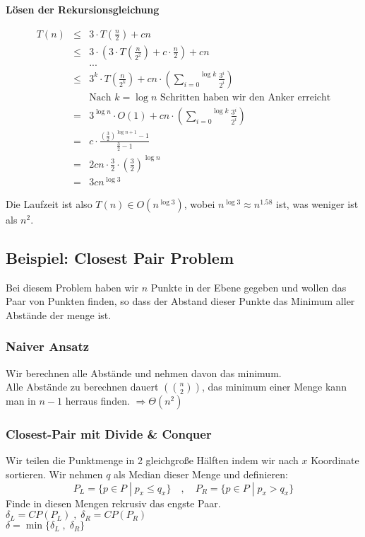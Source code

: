 \textbf{Lösen der Rekursionsgleichung}

$$
\begin{array}{rcl}
T(n) &\leq& 3 \cdot T\left( \frac{n}{2} \right) + cn\\
&\leq& 3 \cdot \left( 3 \cdot T \left( \frac{n}{2^2} \right) + c \cdot \frac{n}{2} \right) + cn\\
&& ... \\
&\leq& 3^k \cdot T\left( \frac{n}{2^k}\right) + cn \cdot \left( \overset{\log k}{\underset{i=0}{\sum}} \frac{3^i}{2^i}\right)\\
&& \text{Nach }k=\log n\text{ Schritten haben wir den Anker erreicht}\\
&=& 3^{\log n} \cdot O(1) + cn \cdot \left( \overset{\log k}{\underset{i=0}{\sum}} \frac{3^i}{2^i}\right)\\
&=& c\cdot \frac{\left( \frac{3}{2}\right)^{\log n + 1} - 1}{\frac{3}{2} - 1}\\
&=& 2cn\cdot \frac{3}{2} \cdot \left( \frac{3}{2} \right)^{\log n}\\
&=&3cn^{\log 3}
\end{array}
$$

Die Laufzeit ist also $T(n) \in O(n^{\log 3})$, wobei $n^{\log 3} \approx n^{1.58}$ ist, was weniger ist als $n^2$.

\subsection{Beispiel: Closest Pair Problem}

Bei diesem Problem haben wir $n$ Punkte in der Ebene gegeben und wollen das Paar von Punkten finden, so dass der Abstand dieser Punkte das Minimum aller Abstände der menge ist.

\subsubsection{Naiver Ansatz}
Wir berechnen alle Abstände und nehmen davon das minimum.\\
Alle Abstände zu berechnen dauert $\left( n \choose 2 \right)$, das minimum einer Menge kann man in $n-1$ herraus finden.
$\Rightarrow \Theta (n^2)$

\subsubsection{Closest-Pair mit Divide \& Conquer}
Wir teilen die Punktmenge in 2 gleichgroße Hälften indem wir nach $x$ Koordinate sortieren.
Wir nehmen $q$ als Median dieser Menge und definieren:
$$
P_L = \{ p \in P \; | \;  p_x \leq q_x \} \quad , \quad P_R = \{ p \in P \; | \; p_x > q_x\}
$$
Finde in diesen Mengen rekrusiv das engste Paar.\\
$\delta_L = CP(P_L) \; , \; \delta_R = CP(P_R)$\\
$\delta = \min \{ \delta_L \; , \; \delta_R \}$\\

